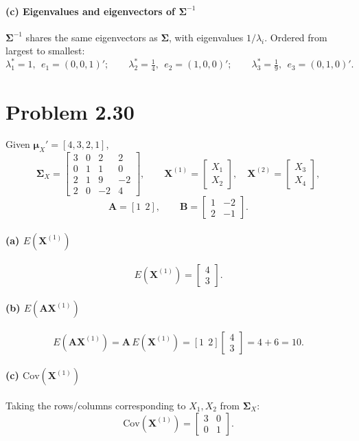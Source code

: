 \documentclass[11pt]{article}
\newcommand{\bA}{\mathbf{A}}
\newcommand{\bB}{\mathbf{B}}
\newcommand{\bX}{\mathbf{X}}
\newcommand{\bSigma}{\boldsymbol{\Sigma}}
\newcommand{\bmu}{\boldsymbol{\mu}}
\begin{document}
\paragraph{(c) Eigenvalues and eigenvectors of $\bSigma^{-1}$}
$\bSigma^{-1}$ shares the same eigenvectors as $\bSigma$, with eigenvalues $1/\lambda_i$. Ordered from largest to smallest:
\[
\lambda_1^{*} = 1,\ \ e_1 = (0,0,1)'; \qquad
\lambda_2^{*} = \tfrac14,\ \ e_2 = (1,0,0)'; \qquad
\lambda_3^{*} = \tfrac19,\ \ e_3 = (0,1,0)'.
\]

\section*{Problem 2.30}

Given $\bmu_X' = [4,3,2,1]$,
\[
\bSigma_X = \begin{bmatrix} 3 & 0 & 2 & 2 \\ 0 & 1 & 1 & 0 \\ 2 & 1 & 9 & -2 \\ 2 & 0 & -2 & 4 \end{bmatrix},
\qquad
\bX^{(1)} = \begin{bmatrix} X_1\\X_2 \end{bmatrix}, \quad
\bX^{(2)} = \begin{bmatrix} X_3\\X_4 \end{bmatrix},
\]
\[
\bA = [1 \ \ 2], \qquad \bB = \begin{bmatrix} 1 & -2 \\ 2 & -1 \end{bmatrix}.
\]

\paragraph{(a) $E(\bX^{(1)})$}
\[
E(\bX^{(1)}) = \begin{bmatrix} 4 \\ 3 \end{bmatrix}.
\]

\paragraph{(b) $E(\bA\bX^{(1)})$}
\[
E(\bA\bX^{(1)}) = \bA\,E(\bX^{(1)}) = [1\ \ 2]\begin{bmatrix} 4\\3 \end{bmatrix} = 4 + 6 = 10.
\]

\paragraph{(c) $\mathrm{Cov}(\bX^{(1)})$}
Taking the rows/columns corresponding to $X_1, X_2$ from $\bSigma_X$:
\[
\mathrm{Cov}(\bX^{(1)}) = \begin{bmatrix} 3 & 0 \\ 0 & 1 \end{bmatrix}.
\]
\end{document}
